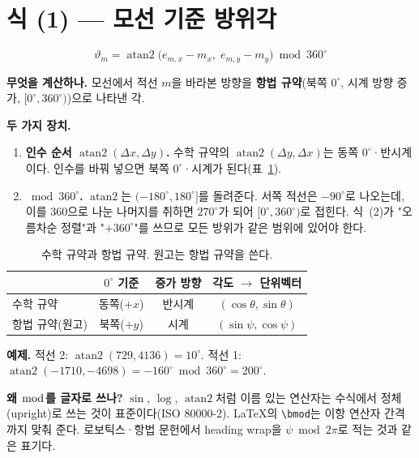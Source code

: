 \documentclass[11pt,a4paper]{article}
\newcommand{\vt}{\vartheta}
\begin{document}
\section{식 (1) --- 모선 기준 방위각}

\begin{equation*}
\vt_m = \operatorname{atan2}\big(e_{m,x}-m_x,\; e_{m,y}-m_y\big) \bmod 360^\circ \tag{1}
\end{equation*}

\textbf{무엇을 계산하나.} 모선에서 적선 $m$을 바라본 방향을 \textbf{항법 규약}(북쪽 $0^\circ$, 시계 방향 증가, $[0^\circ,360^\circ)$)으로 나타낸 각.

\textbf{두 가지 장치.}
\begin{enumerate}
\item \textbf{인수 순서 $\operatorname{atan2}(\Delta x, \Delta y)$.} 수학 규약의 $\operatorname{atan2}(\Delta y, \Delta x)$는 동쪽 $0^\circ$·반시계이다. 인수를 바꿔 넣으면 북쪽 $0^\circ$·시계가 된다(표~\ref{tab:conv}).
\item \textbf{$\bmod 360^\circ$.} $\operatorname{atan2}$는 $(-180^\circ, 180^\circ]$를 돌려준다. 서쪽 적선은 $-90^\circ$로 나오는데, 이를 360으로 나눈 나머지를 취하면 $270^\circ$가 되어 $[0^\circ,360^\circ)$로 접힌다. 식~(2)가 "오름차순 정렬"과 "$+360^\circ$"를 쓰므로 모든 방위가 같은 범위에 있어야 한다.
\end{enumerate}

\begin{table}[H]
\centering\small
\caption{수학 규약과 항법 규약. 원고는 항법 규약을 쓴다.}\label{tab:conv}
\begin{tabular}{l c c c}
\toprule
 & $0^\circ$ 기준 & 증가 방향 & 각도 $\to$ 단위벡터 \\
\midrule
수학 규약 & 동쪽($+x$) & 반시계 & $(\cos\theta, \sin\theta)$ \\
항법 규약(원고) & 북쪽($+y$) & 시계 & $(\sin\psi, \cos\psi)$ \\
\bottomrule
\end{tabular}
\end{table}

\textbf{예제.} 적선 2: $\operatorname{atan2}(729, 4136) = 10^\circ$. 적선 1: $\operatorname{atan2}(-1710, -4698) = -160^\circ \bmod 360^\circ = 200^\circ$.

\begin{whybox}
\textbf{왜 $\bmod$를 글자로 쓰나?} $\sin$, $\log$, $\operatorname{atan2}$처럼 이름 있는 연산자는 수식에서 정체(upright)로 쓰는 것이 표준이다(ISO 80000-2). LaTeX의 \verb|\bmod|는 이항 연산자 간격까지 맞춰 준다. 로보틱스·항법 문헌에서 heading wrap을 $\psi \bmod 2\pi$로 적는 것과 같은 표기다.
\end{whybox}
\end{document}
